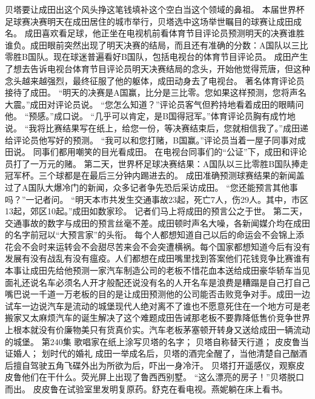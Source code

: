 \documentclass[a4paper,12pt,UTF8,twoside]{ctexbook}
\begin{document}
        贝塔要让成田出这个风头挣这笔钱填补这个空白当这个领域的鼻祖。  
        本届世界杯足球赛决赛明天在成田居住的城市举行，贝塔选中这场举世瞩目的球赛让成田成名。  
        成田喜欢看足球，他正坐在电视机前看体育节目评论员预测明天的决赛谁胜谁负。成田眼前突然出现了明天决赛的结局，而且还有准确的分数：A国队以三比零胜B国队。现在球迷普遍看好B国队，包括电视台的体育节目评论员。  
        成田产生了想去告诉电视台体育节目评论员明天决赛结局的念头，开始他觉得荒唐，但这种念头越来越强烈，最终征服了他的躯体，成田动身去了电视台。  
        著名体育评论员接待了成田。  
        “明天的决赛是A国赢，比分是三比零。您如果这样预测，您将声名大震。”成田对评论员说。  
        “您怎么知道？”评论员客气但矜持地看着成田的眼睛问他。  
        “预感。”成口说。  
        “几乎可以肯定，是B国得冠军。”体育评论员胸有成竹地说。  
        “我将比赛结果写在纸上，给您一份，等决赛结束后，您就相信我了。”成田递给评论员他写好的预测。  
        “我可以和您打赌，B国赢。”评论员当着一屋子同事对成田说。  
        同事们都用嘲笑的目光看成田。  
        在电视台同事们的“公证”下，成田和评论员打了一万元的赌。  
        第二天，世界杯足球决赛结果：A国队以三比零胜B国队捧走冠军杯。三个球都是在最后三分钟内踢进去的。  
        成田准确预测球赛结果的新闻盖过了A国队大爆冷门的新闻，众多记者争先恐后采访成田。 
        “您还能预言其他事吗？”一记者问。  
        “明天本市共发生交通事故23起，死亡7人，伤29人。其中，市区13起，郊区10起。”成田如数家珍。  
        记者们马上将成田的预言公之于世。  
        第二天，交通事故的数字与成田的预言丝毫不差。成田顿时声名大噪，各新闻媒介均在成田的名字前冠以“大预言家”的头衔。  
        每个人都想知道自己以后的命运会不会锦上添花会不会时来运转会不会甜尽苦来会不会突遭横祸。每个国家都想知道今后有没有发展有没有战乱有没有瘟疫。人们都想在成田嘴里找到答案他们花钱竞争比赛谁有本事让成田先给他预测一家汽车制造公司的老板不惜花血本送给成田豪华轿车当见面礼还说名车必须名人开才般配还说没有名的人开名车是浪费是糟蹋是自己打自己嘴巴说一千道一万老板的目的是让成田预测他的公司能否击败竞争对手。成田一边试车一边说汽车是流动的城堡现代人绝对离不了谁也不愿意死住在一个地方可是老搬家又太麻烦汽车的诞生解决了这个难题成田告诫那老板不要靠降低售价竞争世界上根本就没有价廉物美只有货真价实。汽车老板茅塞顿开转身又送给成田一辆流动的城堡。          第240集  
        歌唱家在纸上涂写贝塔的名字；  
        贝塔自称替天行道；  
        皮皮鲁当证婚人；  
        划时代的婚礼    
        成田一举成名后，贝塔的酒完全醒了，当他清楚自己酗酒后擅自驾驶五角飞碟外出为所欲为后，吓出一身冷汗。  
        贝塔打开遥感仪，观察皮皮鲁他们在干什么。荧光屏上出现了鲁西西别墅。  
        “这么漂亮的房子！”贝塔脱口而出。  
        皮皮鲁在试验室里发明复原药。舒克在看电视。燕妮躺在床上看书。  
\end{document}
